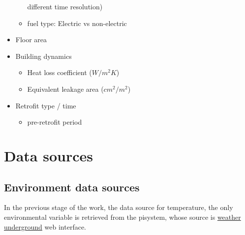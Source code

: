 \documentclass[12pt]{article}
\begin{document}
\begin{itemize}
\begin{itemize}
    different time resolution)
  \item fuel type: Electric vs non-electric ~\cite{Yu20101637}
  \end{itemize}
\item Floor area~\cite{Yu20101637}
\item Building dynamics
  \begin{itemize}
  \item Heat loss coefficient ($W / m^2K$)~\cite{Yu20101637}
  \item Equivalent leakage area ($cm^2 / m^2$)~\cite{Yu20101637}
  \end{itemize}
\item Retrofit type / time
  \begin{itemize}
  \item pre-retrofit period~\cite{kissock2008methodology}
  \end{itemize}
\end{itemize}
\section{Data sources}
\subsection{Environment data sources}
In the previous stage of the work, the data source for temperature,
the only environmental variable is retrieved from the pisystem, whose
source is \href{https://www.wunderground.com/}{weather
  underground} web interface. 
\end{document}
